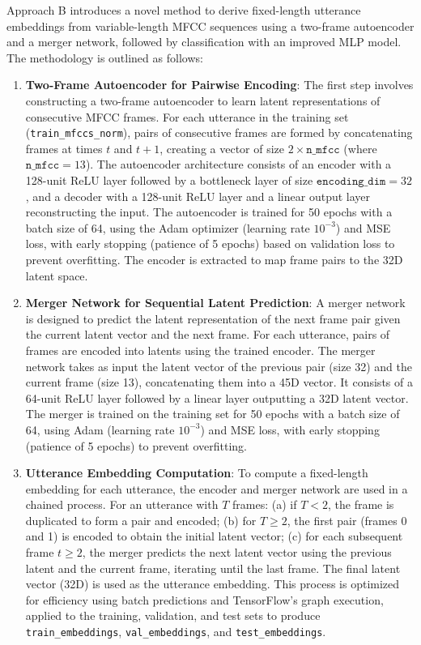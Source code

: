 \documentclass[12pt]{article}
\begin{document}
Approach B introduces a novel method to derive fixed-length utterance embeddings from variable-length MFCC sequences using a two-frame autoencoder and a merger network, followed by classification with an improved MLP model. The methodology is outlined as follows:

\begin{enumerate}
    \item \textbf{Two-Frame Autoencoder for Pairwise Encoding}: The first step involves constructing a two-frame autoencoder to learn latent representations of consecutive MFCC frames. For each utterance in the training set (\texttt{train\_mfccs\_norm}), pairs of consecutive frames are formed by concatenating frames at times $t$ and $t+1$, creating a vector of size $2 \times \texttt{n\_mfcc}$ (where $\texttt{n\_mfcc} = 13$). The autoencoder architecture consists of an encoder with a 128-unit ReLU layer followed by a bottleneck layer of size $\texttt{encoding\_dim} = 32$, and a decoder with a 128-unit ReLU layer and a linear output layer reconstructing the input. The autoencoder is trained for 50 epochs with a batch size of 64, using the Adam optimizer (learning rate $10^{-3}$) and MSE loss, with early stopping (patience of 5 epochs) based on validation loss to prevent overfitting. The encoder is extracted to map frame pairs to the 32D latent space.

    \item \textbf{Merger Network for Sequential Latent Prediction}: A merger network is designed to predict the latent representation of the next frame pair given the current latent vector and the next frame. For each utterance, pairs of frames are encoded into latents using the trained encoder. The merger network takes as input the latent vector of the previous pair (size 32) and the current frame (size 13), concatenating them into a 45D vector. It consists of a 64-unit ReLU layer followed by a linear layer outputting a 32D latent vector. The merger is trained on the training set for 50 epochs with a batch size of 64, using Adam (learning rate $10^{-3}$) and MSE loss, with early stopping (patience of 5 epochs) to prevent overfitting.

    \item \textbf{Utterance Embedding Computation}: To compute a fixed-length embedding for each utterance, the encoder and merger network are used in a chained process. For an utterance with $T$ frames: (a) if $T < 2$, the frame is duplicated to form a pair and encoded; (b) for $T \geq 2$, the first pair (frames 0 and 1) is encoded to obtain the initial latent vector; (c) for each subsequent frame $t \geq 2$, the merger predicts the next latent vector using the previous latent and the current frame, iterating until the last frame. The final latent vector (32D) is used as the utterance embedding. This process is optimized for efficiency using batch predictions and TensorFlow's graph execution, applied to the training, validation, and test sets to produce \texttt{train\_embeddings}, \texttt{val\_embeddings}, and \texttt{test\_embeddings}.


\end{enumerate}
\end{document}
